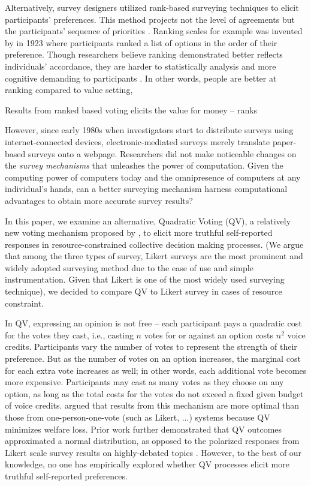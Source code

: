 Alternatively, survey designers utilized rank-based surveying techniques to elicit participants' preferences. This method projects not the level of agreements but the participants' sequence of priorities \cite{moors2016two}. Ranking scales for example was invented by \textcite{starch1923methods} in 1923 where participants ranked a list of options in the order of their preference. Though researchers believe ranking demonstrated better reflects individuals' accordance, they are harder to statistically analysis and more cognitive demanding to participants \cite{moors2016two}. In other words, people are better at ranking compared to value setting, 


Results from ranked based voting elicits the value for money -- ranks 


However, since early 1980s when investigators start to distribute surveys using internet-connected devices, electronic-mediated surveys merely translate paper-based surveys onto a webpage. Researchers did not make noticeable changes on the \textit{survey mechanisms} that unleashes the power of computation. Given the computing power of computers today and the omnipresence of computers at any individual's hands, can a better surveying mechanism harness computational advantages to obtain more accurate survey results?

In this paper, we examine an alternative, Quadratic Voting (QV), a relatively new voting mechanism proposed by \textcite{posner2018radical}, to elicit more truthful self-reported responses in resource-constrained collective decision making processes. (We argue that among the three types of survey, Likert surveys are the most prominent and widely adopted surveying method due to the ease of use and simple instrumentation. Given that Likert is one of the most widely used surveying technique), we decided to compare QV to Likert survey in cases of resource constraint. 

In QV, expressing an opinion is not free -- each participant pays a quadratic cost for the votes they cast, i.e., casting $n$ votes for or against an option costs $n^2$ voice credits. Participants vary the number of votes to represent the strength of their preference. But as the number of votes on an option increases, the marginal cost for each extra vote increases as well; in other words, each additional vote becomes more expensive. Participants may cast as many votes as they choose on any option, as long as the total costs for the votes do not exceed a fixed given budget of voice credits. \textcite{posner2018radical} argued that results from this mechanism are more optimal than those from one-person-one-vote (such as Likert, ...) systems because QV minimizes welfare loss. Prior work further demonstrated that QV outcomes approximated a normal distribution, as opposed to the polarized responses from Likert scale survey results on highly-debated topics \cite{quarfoot2017quadratic}. However, to the best of our knowledge, no one has empirically explored whether QV processes elicit more truthful self-reported preferences. 

